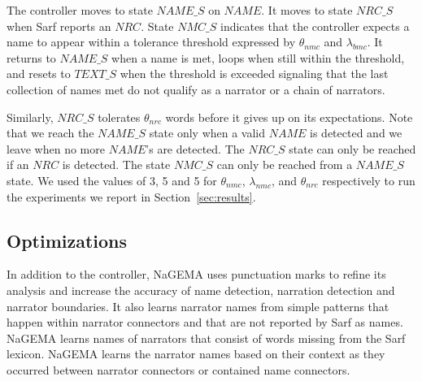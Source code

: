 \documentclass[11pt]{article}
\begin{document}
The controller moves to state $\mathit{NAME\_S}$ on
$\mathit{NAME}$.
It moves to state $\mathit{NRC\_S}$ 
when Sarf reports an $\mathit{NRC}$.
State $\mathit{NMC\_S}$
indicates that the controller expects a name to appear within 
a tolerance threshold expressed by 
$\theta_{\mathit{nmc}}$ and $\lambda_{\mathit{bmc}}$.
It returns to $\mathit{NAME\_S}$ when a name is met, 
loops when still within the threshold, and 
resets to $\mathit{TEXT\_S}$ when the threshold is exceeded 
signaling that the last collection of names met do not qualify
as a narrator or a chain of narrators. 

Similarly, $\mathit{NRC\_S}$ tolerates $\theta_{\mathit{nrc}}$ words 
before it gives up on its expectations. 
Note that we reach the $\mathit{NAME\_S}$
state only when a
valid $\mathit{NAME}$ is detected and we leave when no 
more $\mathit{NAME}$'s are detected.
The $\mathit{NRC\_S}$ state can only be reached if an 
$\mathit{NRC}$ is detected.
The state $\mathit{NMC\_S}$ can only be reached from a 
$\mathit{NAME\_S}$ state.
We used the values of 3, 5 and 5 for $\theta_{\mathit{nmc}}$, 
$\lambda_{\mathit{nmc}}$, and 
$\theta_{\mathit{nrc}}$ respectively to run the experiments 
we report in Section~\ref{sec:results}.

\begin{figure}[tb!]
\end{figure}


\subsection{Optimizations}

In addition to the controller, 
NaGEMA uses punctuation marks to refine its analysis and 
increase the accuracy of name detection, narration detection and narrator boundaries. 
It also learns narrator names from simple patterns that 
happen within narrator connectors and that are not 
reported by Sarf as names. 
NaGEMA learns names of narrators that consist of words missing from 
the Sarf lexicon.
NaGEMA learns the narrator names based on their context as they occurred 
between narrator connectors or contained name connectors. 
\end{document}
